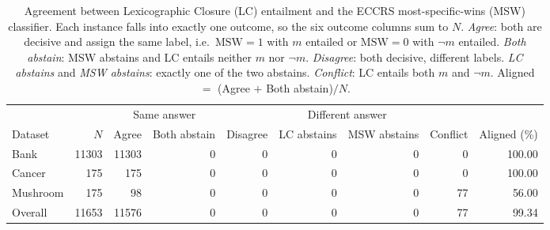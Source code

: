 \begin{table}[t]
\centering
\caption{Agreement between Lexicographic Closure (LC) entailment and the ECCRS most-specific-wins (MSW) classifier. Each instance falls into exactly one outcome, so the six outcome columns sum to $N$. \emph{Agree}: both are decisive and assign the same label, i.e.\ $\mathrm{MSW}=1$ with $m$ entailed or $\mathrm{MSW}=0$ with $\neg m$ entailed. \emph{Both abstain}: MSW abstains and LC entails neither $m$ nor $\neg m$. \emph{Disagree}: both decisive, different labels. \emph{LC abstains} and \emph{MSW abstains}: exactly one of the two abstains. \emph{Conflict}: LC entails both $m$ and $\neg m$. Aligned $=$ (Agree $+$ Both abstain)$/N$.}
\label{tab:agreement}
\begin{tabular}{lrrrrrrrr}
\toprule
 & & \multicolumn{2}{c}{Same answer} & \multicolumn{4}{c}{Different answer} & \\
\cmidrule(lr){3-4}\cmidrule(lr){5-8}
Dataset & $N$ & Agree & Both abstain & Disagree & LC abstains & MSW abstains & Conflict & Aligned (\%) \\
\midrule
Bank & 11303 & 11303 & 0 & 0 & 0 & 0 & 0 & 100.00 \\
Cancer & 175 & 175 & 0 & 0 & 0 & 0 & 0 & 100.00 \\
Mushroom & 175 & 98 & 0 & 0 & 0 & 0 & 77 & 56.00 \\
\midrule
Overall & 11653 & 11576 & 0 & 0 & 0 & 0 & 77 & 99.34 \\
\bottomrule
\end{tabular}
\end{table}

